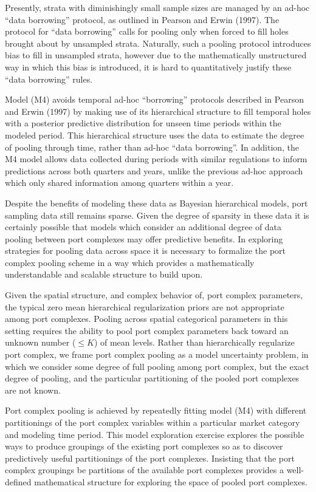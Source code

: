 \documentclass[12pt]{article}
\begin{document}
Presently, strata with diminishingly small sample sizes are managed by
an ad-hoc ``data borrowing'' protocol, as outlined in Pearson and Erwin
(1997). The protocol for ``data borrowing'' calls for pooling only when
forced to fill holes brought about by unsampled strata. Naturally, such
a pooling protocol introduces bias to fill in unsampled strata, however
due to the mathematically unstructured way in which this bias is
introduced, it is hard to quantitatively justify these ``data
borrowing'' rules.

Model (M4) avoids temporal ad-hoc ``borrowing'' protocols described in
Pearson and Erwin (1997) by making use of its hierarchical structure to
fill temporal holes with a posterior predictive distribution for unseen
time periods within the modeled period. This hierarchical structure uses
the data to estimate the degree of pooling through time, rather than
ad-hoc ``data borrowing''. In addition, the M4 model allows data collected 
during periods with similar regulations to inform predictions across both 
quarters and years, unlike the previous ad-hoc approach which only shared 
information among quarters within a year.

Despite the benefits of modeling these data as Bayesian hierarchical
models, port sampling data still remains sparse. Given the degree of
sparsity in these data it is certainly possible that models which
consider an additional degree of data pooling between port complexes may
offer predictive benefits. In exploring strategies for pooling data
across space it is necessary to formalize the port complex pooling
scheme in a way which provides a mathematically understandable and
scalable structure to build upon.

Given the spatial structure, and complex behavior of, port complex
parameters, the typical zero mean hierarchical regularization priors are
not appropriate among port complexes. Pooling across spatial categorical
parameters in this setting requires the ability to pool port complex
parameters back toward an unknown number (\(\le K\)) of mean levels.
Rather than hierarchically regularize port complex, we frame port
complex pooling as a model uncertainty problem, in which we consider
some degree of full pooling among port complex, but the exact degree of
pooling, and the particular partitioning of the pooled port complexes
are not known.

Port complex pooling is achieved by repeatedly fitting model (M4) with
different partitionings of the port complex variables within a
particular market category and modeling time period. This model
exploration exercise explores the possible ways to produce groupings of
the existing port complexes so as to discover predictively useful
partitionings of the port complexes. Insisting that the port complex
groupings be partitions of the available port complexes provides a
well-defined mathematical structure for exploring the space of pooled
port complexes.
\end{document}

